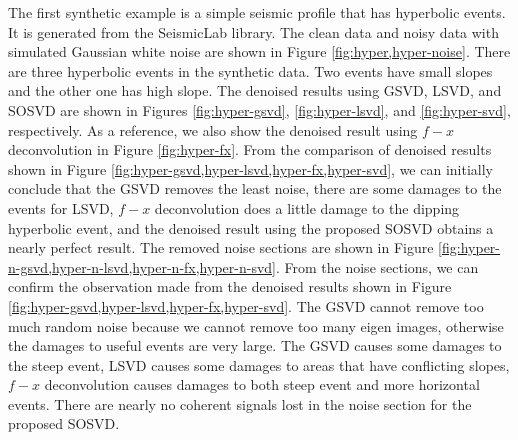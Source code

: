 The first synthetic example is a simple seismic profile that has hyperbolic events. It is generated from the SeismicLab library. The clean data and noisy data with simulated Gaussian white noise are shown in Figure \ref{fig:hyper,hyper-noise}. There are three hyperbolic events in the synthetic data. Two events have small slopes and the other one has high slope. The denoised results using GSVD, LSVD, and SOSVD are shown in Figures \ref{fig:hyper-gsvd}, \ref{fig:hyper-lsvd}, and \ref{fig:hyper-svd}, respectively. As a reference, we also show the denoised result using $f-x$ deconvolution in Figure \ref{fig:hyper-fx}. From the comparison of denoised results shown in Figure \ref{fig:hyper-gsvd,hyper-lsvd,hyper-fx,hyper-svd}, we can initially conclude that the GSVD removes the least noise, there are some damages to the events for LSVD, $f-x$ deconvolution does a little damage to the dipping hyperbolic event, and the denoised result using the proposed SOSVD obtains a nearly perfect result. The removed noise sections are shown in Figure \ref{fig:hyper-n-gsvd,hyper-n-lsvd,hyper-n-fx,hyper-n-svd}. From the noise sections, we can confirm the observation made from the denoised results shown in Figure \ref{fig:hyper-gsvd,hyper-lsvd,hyper-fx,hyper-svd}. The GSVD cannot remove too much random noise because we cannot remove too many eigen images, otherwise the damages to useful events are very large. The GSVD causes some damages to the steep event, LSVD causes some damages to areas that have conflicting slopes, $f-x$ deconvolution causes damages to both steep event and more horizontal events. There are nearly no coherent signals lost in the noise section for the proposed SOSVD.

